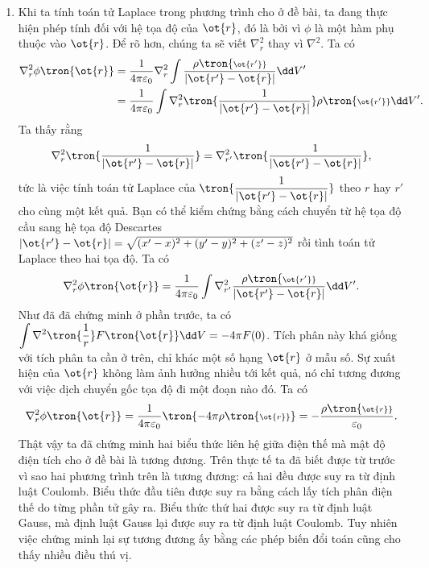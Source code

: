 \begin{loigiai}
\begin{enumerate}[1)]
            \item Khi ta tính toán tử Laplace trong phương trình cho ở đề bài, ta đang thực hiện phép tính đối với hệ tọa độ của $\ot{r}$, đó là bởi vì $\phi$ là một hàm phụ thuộc vào $\ot{r}$. Để rõ hơn, chúng ta sẽ viết $\nabla^2_r$ thay vì $\nabla^2$. Ta có
            \begin{equation}
               \begin{aligned}
                   \nabla^2_r\phi\tron{\ot{r}}&=\dfrac{1}{4\pi \varepsilon_0}\nabla^2_r\int\dfrac{\rho\tron{\scriptstyle\ot{r'}}}{\left|\ot{r'}-\ot{r}\right|}\dd V'\\
                   &=\dfrac{1}{4\pi \varepsilon_0}\int\nabla^2_r\tron{\dfrac{1}{\left|\ot{r'}-\ot{r}\right|}}\rho\tron{\scriptstyle\ot{r'}}\dd V'.
               \end{aligned} 
               \end{equation}
               Ta thấy rằng
               \begin{equation}
               \nabla^2_r\tron{\dfrac{1}{\left|\ot{r'}-\ot{r}\right|}}=\nabla^2_{r'}\tron{\dfrac{1}{\left|\ot{r'}-\ot{r}\right|}},
               \end{equation}
               tức là việc tính toán tử Laplace của $\tron{\dfrac{1}{\left|\ot{r'}-\ot{r}\right|}}$ theo $r$ hay $r'$ cho cùng một kết quả. Bạn có thể kiểm chứng bằng cách chuyển từ hệ tọa độ cầu sang hệ tọa độ Descartes  $\left|\ot{r'}-\ot{r}\right|=\sqrt{(x'-x)^2+(y'-y)^2+(z'-z)^2}$ rồi tình toán tử Laplace theo hai tọa độ. Ta có
               \begin{equation}
                    \nabla^2_r\phi\tron{\ot{r}}=\dfrac{1}{4\pi \varepsilon_0}\int\nabla^2_{r'}\dfrac{\rho\tron{\scriptstyle\ot{r'}}}{\left|\ot{r'}-\ot{r}\right|}\dd V'.
               \end{equation}
               Như đã đã chứng minh ở phần trước, ta có $\displaystyle\int \nabla^2\tron{\dfrac{1}{r}}F\tron{\ot{r}}\dd V=-4\pi F(0)$. Tích phân này khá giống với tích phân ta cần ở trên, chỉ khác một số hạng $\ot{r}$ ở mẫu số. Sự xuất hiện của $\ot{r}$ không làm ảnh hưởng nhiều tới kết quả, nó chỉ tương đương với việc dịch chuyển gốc tọa độ đi một đoạn nào đó. Ta có
               \begin{equation}
                   \nabla^2_r\phi\tron{\ot{r}}=\dfrac{1}{4\pi\varepsilon_0}\tron{-4\pi\rho\tron{\scriptstyle\ot{r}}}=-\dfrac{\rho\tron{\scriptstyle\ot{r}}}{\varepsilon_0}.
               \end{equation}
               Thật vậy ta đã chứng minh hai biểu thức liên hệ giữa điện thế mà mật độ điện tích cho ở đề bài là tương đương. Trên thực tế ta đã biết được từ trước vì sao hai phương trình trên là tương đương: cả hai đều được suy ra từ định luật Coulomb. Biểu thức đầu tiên được suy ra bằng cách lấy tích phân điện thế do từng phần tử gây ra. Biểu thức thứ hai được suy ra từ định luật Gauss, mà định luật Gauss lại được suy ra từ định luật Coulomb. Tuy nhiên việc chứng minh lại sự tương đương ấy bằng các phép biến đổi toán cũng cho thấy nhiều điều thú vị.
        \end{enumerate}
    \end{loigiai}




